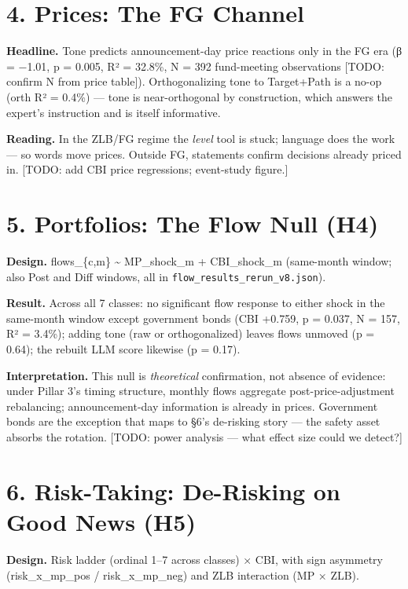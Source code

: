 \section{4. Prices: The FG Channel}\label{prices-the-fg-channel}

\textbf{Headline.} Tone predicts announcement-day price reactions only in the FG era (β = −1.01, p = 0.005, R² = 32.8\%, N = 392 fund-meeting observations {[}TODO: confirm N from price table{]}). Orthogonalizing tone to Target+Path is a no-op (orth R² = 0.4\%) --- tone is near-orthogonal by construction, which answers the expert's instruction and is itself informative.

\textbf{Reading.} In the ZLB/FG regime the \emph{level} tool is stuck; language does the work --- so words move prices. Outside FG, statements confirm decisions already priced in. {[}TODO: add CBI price regressions; event-study figure.{]}

\section{5. Portfolios: The Flow Null (H4)}\label{portfolios-the-flow-null-h4}

\textbf{Design.} flows\_\{c,m\} \textasciitilde{} MP\_shock\_m + CBI\_shock\_m (same-month window; also Post and Diff windows, all in \texttt{flow\_results\_rerun\_v8.json}).

\textbf{Result.} Across all 7 classes: no significant flow response to either shock in the same-month window except government bonds (CBI +0.759, p = 0.037, N = 157, R² = 3.4\%); adding tone (raw or orthogonalized) leaves flows unmoved (p = 0.64); the rebuilt LLM score likewise (p = 0.17).

\textbf{Interpretation.} This null is \emph{theoretical} confirmation, not absence of evidence: under Pillar 3's timing structure, monthly flows aggregate post-price-adjustment rebalancing; announcement-day information is already in prices. Government bonds are the exception that maps to §6's de-risking story --- the safety asset absorbs the rotation. {[}TODO: power analysis --- what effect size could we detect?{]}

\section{6. Risk-Taking: De-Risking on Good News (H5)}\label{risk-taking-de-risking-on-good-news-h5}

\textbf{Design.} Risk ladder (ordinal 1--7 across classes) × CBI, with sign asymmetry (risk\_x\_mp\_pos / risk\_x\_mp\_neg) and ZLB interaction (MP × ZLB).

